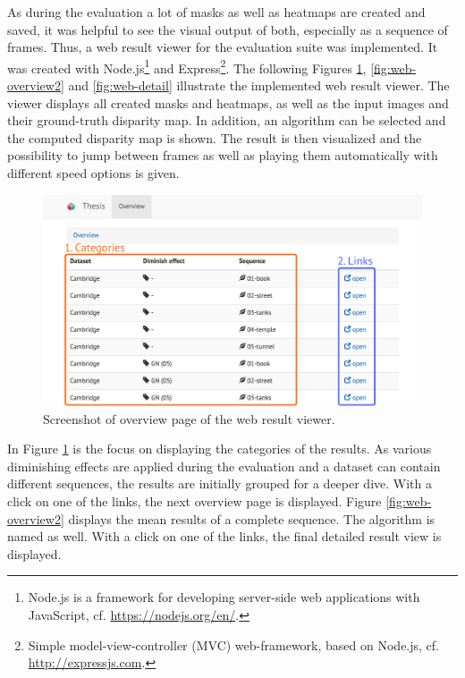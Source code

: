 As during the evaluation a lot of masks as well as heatmaps are created and saved, it was helpful to see the visual output of both, especially as a sequence of frames.
Thus, a web result viewer for the evaluation suite was implemented.
It was created with Node.js\footnote{Node.js is a framework for developing server-side web applications with JavaScript, cf. \url{https://nodejs.org/en/}.} and Express\footnote{Simple model-view-controller (MVC) web-framework, based on Node.js, cf. \url{http://expressjs.com}.}.
\newline\newline\noindent The following Figures \ref{fig:web-overview}, \ref{fig:web-overview2} and \ref{fig:web-detail} illustrate the implemented web result viewer.
The viewer displays all created masks and heatmaps, as well as the input images and their ground-truth disparity map.
In addition, an algorithm can be selected and the computed disparity map is shown.
The result is then visualized and the possibility to jump between frames as well as playing them automatically with different speed options is given.

\begin{figure}[h!]
  \centering
  \includegraphics[width=1.0\textwidth]{src/images/result-viewer-overview.png}
  \caption[Screenshot of overview page of the web result viewer]{Screenshot of overview page of the web result viewer.}
  \label{fig:web-overview}
\end{figure}

\noindent In Figure \ref{fig:web-overview} is the focus on displaying the categories of the results.
As various diminishing effects are applied during the evaluation and a dataset can contain different sequences, the results are initially grouped for a deeper dive.
With a click on one of the links, the next overview page is displayed.
Figure \ref{fig:web-overview2} displays the mean results of a complete sequence.
The algorithm is named as well.
With a click on one of the links, the final detailed result view is displayed.

